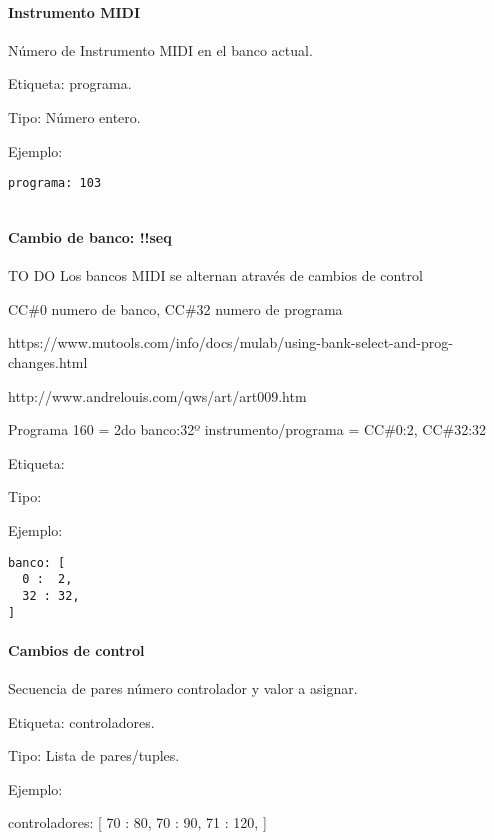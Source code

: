 \documentclass[]{article}
\let\oldparagraph\paragraph
\renewcommand{\paragraph}[1]{\oldparagraph{#1}\mbox{}}
\begin{document}
\hypertarget{instrumento-midi}{%
\paragraph{Instrumento MIDI}\label{instrumento-midi}}

Número de Instrumento MIDI en el banco actual.

Etiqueta: programa.

Tipo: Número entero.

Ejemplo:

\begin{Verbatim}
programa: 103
 
\end{Verbatim}

\hypertarget{cambio-de-banco-seq}{%
\paragraph{Cambio de banco: !!seq}\label{cambio-de-banco-seq}}

TO DO Los bancos MIDI se alternan através de cambios de control

CC\#0 numero de banco, CC\#32 numero de programa

https://www.mutools.com/info/docs/mulab/using-bank-select-and-prog-changes.html

http://www.andrelouis.com/qws/art/art009.htm

Programa 160 = 2do banco:32º instrumento/programa = CC\#0:2, CC\#32:32

Etiqueta:

Tipo:

Ejemplo:

\begin{Verbatim}
banco: [
  0 :  2,
  32 : 32,
]
\end{Verbatim}

\hypertarget{cambios-de-control}{%
\paragraph{Cambios de control}\label{cambios-de-control}}

Secuencia de pares número controlador y valor a asignar.

Etiqueta: controladores.

Tipo: Lista de pares/tuples.

Ejemplo:

controladores: {[} 70 : 80, 70 : 90, 71 : 120, {]}

\newpage
\end{document}
